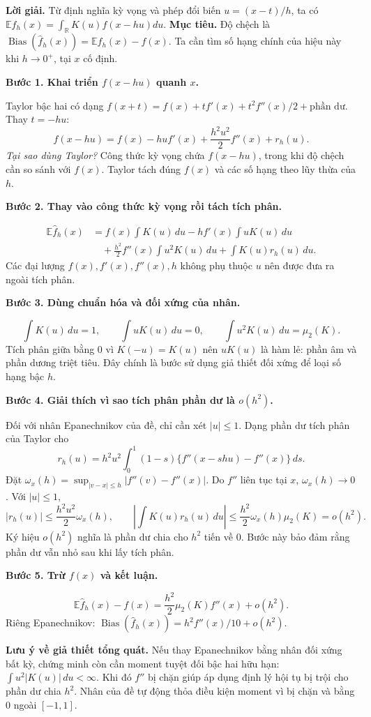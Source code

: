 \documentclass[11pt,a4paper]{article}
\newcommand{\E}{\mathbb E}
\newcommand{\R}{\mathbb R}
\newcommand{\fh}{\widehat f_h}
\DeclareMathOperator{\Bias}{Bias}
\newcommand{\buoc}[1]{\par\medskip\textbf{#1}\par}
\begin{document}
\textbf{Lời giải.} Từ định nghĩa kỳ vọng và phép đổi biến $u=(x-t)/h$, ta có
$\E\widehat f_h(x)=\int_{\R}K(u)f(x-hu)du$.
\textbf{Mục tiêu.} Độ chệch là $\Bias(\fh(x))=\E\fh(x)-f(x)$. Ta cần tìm số hạng chính của hiệu này khi $h\to0^+$, tại $x$ cố định.

\buoc{Bước 1. Khai triển $f(x-hu)$ quanh $x$.}
Taylor bậc hai có dạng $f(x+t)=f(x)+tf'(x)+t^2f''(x)/2+\text{phần dư}$. Thay $t=-hu$:
\[
f(x-hu)=f(x)-hu f'(x)+\frac{h^2u^2}{2}f''(x)+r_h(u).
\]
\textit{Tại sao dùng Taylor?} Công thức kỳ vọng chứa $f(x-hu)$, trong khi độ chệch cần so sánh với $f(x)$. Taylor tách đúng $f(x)$ và các số hạng theo lũy thừa của $h$.

\buoc{Bước 2. Thay vào công thức kỳ vọng rồi tách tích phân.}
\begin{align*}
\E\fh(x)
&=f(x)\int K(u)\,du-hf'(x)\int uK(u)\,du\\
&\quad+\frac{h^2}{2}f''(x)\int u^2K(u)\,du+\int K(u)r_h(u)\,du.
\end{align*}
Các đại lượng $f(x),f'(x),f''(x),h$ không phụ thuộc $u$ nên được đưa ra ngoài tích phân.

\buoc{Bước 3. Dùng chuẩn hóa và đối xứng của nhân.}
\[
\int K(u)\,du=1,\qquad \int uK(u)\,du=0,\qquad
\int u^2K(u)\,du=\mu_2(K).
\]
Tích phân giữa bằng 0 vì $K(-u)=K(u)$ nên $uK(u)$ là hàm lẻ: phần âm và phần dương triệt tiêu. Đây chính là bước sử dụng giả thiết đối xứng để loại số hạng bậc $h$.

\buoc{Bước 4. Giải thích vì sao tích phân phần dư là $o(h^2)$.}
Đối với nhân Epanechnikov của đề, chỉ cần xét $|u|\leq1$. Dạng phần dư tích phân của Taylor cho
\[
r_h(u)=h^2u^2\int_0^1(1-s)\{f''(x-shu)-f''(x)\}\,ds.
\]
Đặt $\omega_x(h)=\sup_{|v-x|\leq h}|f''(v)-f''(x)|$. Do $f''$ liên tục tại $x$, $\omega_x(h)\to0$. Với $|u|\leq1$,
\[
|r_h(u)|\leq\frac{h^2u^2}{2}\omega_x(h),\qquad
\left|\int K(u)r_h(u)\,du\right|
\leq\frac{h^2}{2}\omega_x(h)\mu_2(K)=o(h^2).
\]
Ký hiệu $o(h^2)$ nghĩa là phần dư chia cho $h^2$ tiến về 0. Bước này bảo đảm rằng phần dư vẫn nhỏ sau khi lấy tích phân.

\buoc{Bước 5. Trừ $f(x)$ và kết luận.}
\[
\boxed{\E\fh(x)-f(x)=\frac{h^2}{2}\mu_2(K)f''(x)+o(h^2).}
\]
Riêng Epanechnikov: $\Bias(\fh(x))=h^2f''(x)/10+o(h^2)$.

\textbf{Lưu ý về giả thiết tổng quát.} Nếu thay Epanechnikov bằng nhân đối xứng bất kỳ, chứng minh còn cần moment tuyệt đối bậc hai hữu hạn: $\int u^2|K(u)|\,du<\infty$. Khi đó $f''$ bị chặn giúp áp dụng định lý hội tụ bị trội cho phần dư chia $h^2$. Nhân của đề tự động thỏa điều kiện moment vì bị chặn và bằng 0 ngoài $[-1,1]$.
\end{document}
